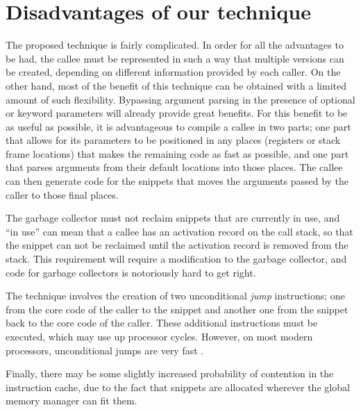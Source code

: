 \section{Disadvantages of our technique}

The proposed technique is fairly complicated.  In order for all the
advantages to be had, the callee must be represented in such a way
that multiple versions can be created, depending on different
information provided by each caller.  On the other hand, most of the
benefit of this technique can be obtained with a limited amount of
such flexibility.  Bypassing argument parsing in the presence of
optional or keyword parameters will already provide great benefits.
For this benefit to be as useful as possible, it is advantageous to
compile a callee in two parts; one part that allows for its parameters
to be positioned in any places (registers or stack frame locations)
that makes the remaining code as fast as possible, and one part that
parses arguments from their default locations into those places.  The
callee can then generate code for the snippets that moves the
arguments passed by the caller to those final places.

The garbage collector must not reclaim snippets that are currently in
use, and ``in use'' can mean that a callee has an activation record on
the call stack, so that the snippet can not be reclaimed until the
activation record is removed from the stack.  This requirement will
require a modification to the garbage collector, and code for garbage
collectors is notoriously hard to get right.

The technique involves the creation of two unconditional \emph{jump}
instructions; one from the core code of the caller to the snippet and
another one from the snippet back to the core code of the caller.
These additional instructions must be executed, which may use up
processor cycles.  However, on most modern processors, unconditional
jumps are very fast \cite{10.5555/3207796}.

Finally, there may be some slightly increased probability of
contention in the instruction cache, due to the fact that snippets are
allocated wherever the global memory manager can fit them.

